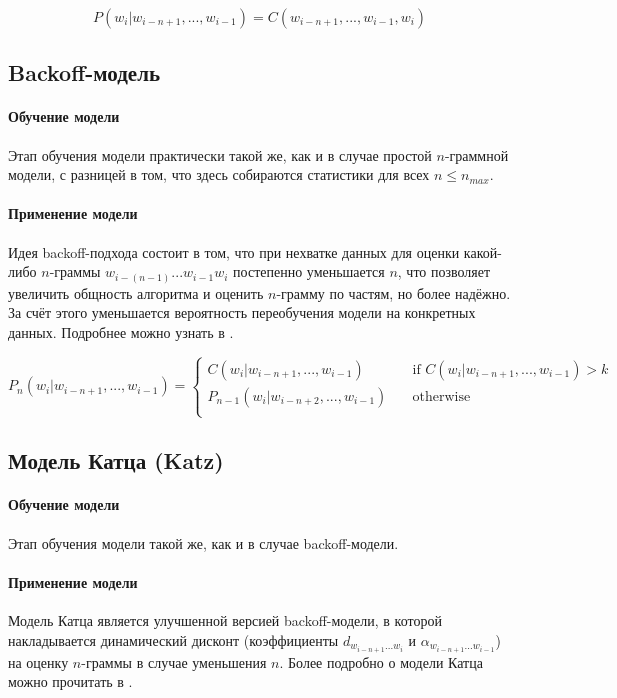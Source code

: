 $$ P(w_i | w_{i - n + 1}, ..., w_{i - 1}) = C(w_{i - n + 1}, ..., w_{i - 1}, w_i) $$

\subsection{ Backoff-модель } 

\paragraph{ Обучение модели } Этап обучения модели практически такой же, как и в случае простой $n$-граммной модели, с разницей в том, что здесь собираются статистики для всех $n \leq n_{max}$.

\paragraph{ Применение модели } Идея backoff-подхода состоит в том, что при нехватке данных для оценки какой-либо $n$-граммы $w_{i - (n - 1)} ... w_{i - 1} w_i$ постепенно уменьшается $n$, что позволяет увеличить общность алгоритма и оценить $n$-грамму по частям, но более надёжно. За счёт этого уменьшается вероятность переобучения модели на конкретных данных. Подробнее можно узнать в \cite{manning}.

\[ P_n(w_i | w_{i - n + 1}, ..., w_{i - 1}) =
\begin{cases}
	C(w_i | w_{i - n + 1}, ..., w_{i - 1})       & \quad \text{if } C(w_i | w_{i - n + 1}, ..., w_{i - 1}) > k\\
	P_{n - 1}(w_i | w_{i - n + 2}, ..., w_{i - 1})  & \quad \text{otherwise }\\
\end{cases}
\]

\subsection{ Модель Катца (Katz) }

\paragraph{ Обучение модели } Этап обучения модели такой же, как и в случае backoff-модели.

\paragraph{ Применение модели } Модель Катца является улучшенной версией backoff-модели, в которой накладывается динамический дисконт (коэффициенты $d_{w_{i-n+1}...w_i}$ и $\alpha_{w_{i-n+1}...w_{i-1}}$) на оценку $n$-граммы в случае уменьшения $n$. Более подробно о модели Катца можно прочитать в \cite{katz:backoff}.

